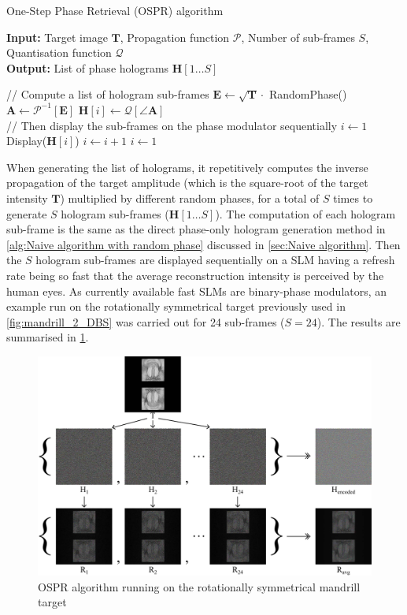 \begin{algorithm}[H]
  \caption{One-Step Phase Retrieval (OSPR) algorithm}\label{alg:One-Step Phase Retrieval (OSPR) algorithm}
  \textbf{Input:} Target image $\textbf{T}$, Propagation function $\mathcal{P}$, Number of sub-frames $S$, Quantisation function $\mathcal{Q}$\\
  \textbf{Output:} List of phase holograms $\textbf{H}[1\ldots S]$
  \begin{algorithmic}
    \State // Compute a list of hologram sub-frames
    \State $\textbf{E} \gets \sqrt{\textbf{T}} \cdot $ RandomPhase()
    \State $\textbf{A} \gets \mathcal{P}^{-1}[\textbf{E}]$
    \State $\textbf{H}[i] \gets \mathcal{Q}[\angle \textbf{A}]$
    \EndFor\\
    \State // Then display the sub-frames on the phase modulator sequentially
    \State $i\gets 1$
    \State Display($\textbf{H}[i]$)
    \State $i\gets i + 1$
    \State $i\gets 1$
    \EndIf
    \EndWhile
  \end{algorithmic}
\end{algorithm}

When generating the list of holograms, it repetitively computes the inverse propagation of the target amplitude (which is the square-root of the target intensity $\textbf{T}$) multiplied by different random phases, for a total of $S$ times to generate $S$ hologram sub-frames ($\textbf{H}[1\ldots S]$). The computation of each hologram sub-frame is the same as the direct phase-only hologram generation method in \cref{alg:Naive algorithm with random phase} discussed in \cref{sec:Naive algorithm}. Then the $S$ hologram sub-frames are displayed sequentially on a SLM having a refresh rate being so fast that the average reconstruction intensity is perceived by the human eyes. As currently available fast SLMs are binary-phase modulators, an example run on the rotationally symmetrical target previously used in \cref{fig:mandrill_2_DBS} was carried out for 24 sub-frames ($S=24$). The results are summarised in \cref{fig:ospr_mandrill_2}.

\begin{figure}[H]
	\centering
	\includegraphics[width=1.0\textwidth]{ospr_mandrill_2.pdf}
	\caption{OSPR algorithm running on the rotationally symmetrical mandrill target}
	\label{fig:ospr_mandrill_2}
\end{figure}

